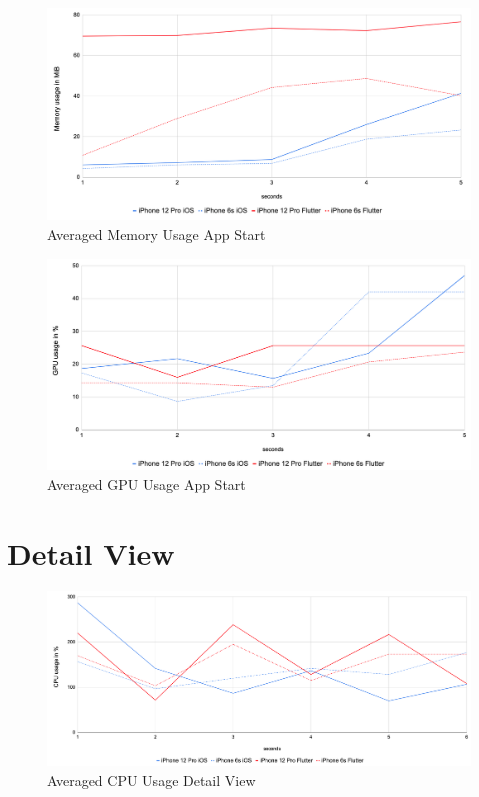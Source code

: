 \begin{figure}[!htbp]
    \centering
    \includegraphics[width=\linewidth]{images/performance_results/app_start/avg_memory_usage_app_start.png}
    \caption{Averaged Memory Usage App Start}
    \label{fig:avg_memory_usage_app_start}
\end{figure}

\begin{figure}[!htbp]
    \centering
    \includegraphics[width=\linewidth]{images/performance_results/app_start/avg_gpu_usage_app_start.png}
    \caption{Averaged GPU Usage App Start}
    \label{fig:avg_gpu_usage_app_start}
\end{figure}
\FloatBarrier

\section{Detail View}
\begin{figure}[!htbptb]
    \centering
    \includegraphics[width=\linewidth]{images/performance_results/detail_view/avg_cpu_usage_detail_view.png}
    \caption{Averaged CPU Usage Detail View}
    \label{fig:avg_cpu_usage_detail_view}
\end{figure}


